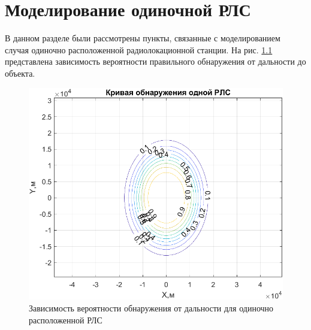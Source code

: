 \chapter{Моделирование одиночной РЛС}
\label{cha:analysis}

В данном разделе были рассмотрены пункты, связанные с моделированием случая одиночно расположенной радиолокационной станции. На рис. \ref{fig:RLS_1_dist} представлена зависимость вероятности правильного обнаружения от дальности до объекта.

\begin{figure}
    \centering
    \includegraphics{figures/SingleRLS.png}
    \caption{Зависимость вероятности обнаружения от дальности для одиночно расположенной РЛС}
    \label{fig:RLS_1_dist}
\end{figure}
